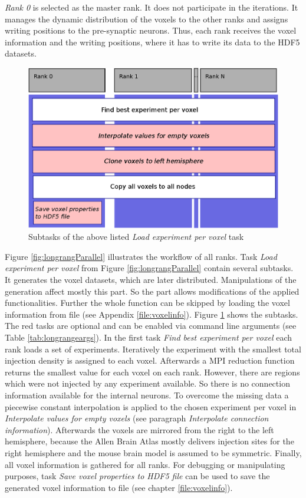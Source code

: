 \emph{Rank 0} is selected as the master rank. It does not participate in the iterations.
It manages the dynamic distribution of the voxels to the other ranks and 
assigns writing positions to the pre-synaptic neurons. Thus, each rank receives the 
voxel information and the writing positions,
where it has to write its data to the HDF5 datasets.
\begin{figure}[ht!]
\centering
\includegraphics[scale=0.5]{pictures/longRange_BestExp_parallelAlg.eps}
\caption{Subtasks of the above listed \emph{Load experiment per voxel} task}
\label{fig:longrangeLEPV}
\end{figure}

Figure \ref{fig:longrangParallel} illustrates the workflow of all ranks.
Task \emph{Load experiment per voxel} from Figure \ref{fig:longrangParallel} contain several subtasks.
It generates the voxel datasets, which are later distributed.
Manipulations of the generation affect mostly this part.
So the part allows modifications of the applied functionalities. 
Further the whole function can be skipped by loading the voxel information from file (see Appendix \ref{file:voxelinfo}).
Figure \ref{fig:longrangeLEPV} shows the subtasks.
The red tasks are optional and can be enabled via command line arguments (see Table \ref{tab:longrangeargs}).
In the first task \emph{Find best experiment per voxel} each rank loads a set of experiments.
Iteratively the experiment with the smallest total injection density is assigned to each voxel.
Afterwards a MPI reduction function returns the smallest value for each voxel on
each rank.
However, there are regions which were not injected by any experiment available.
So there is no connection information available for the internal neurons.
To overcome the missing data a piecewise constant interpolation is applied to the chosen experiment per voxel
in \emph{Interpolate values for empty voxels} (see paragraph \emph{Interpolate connection information}).
Afterwards the voxels are mirrored from the right to the left hemisphere, because the
Allen Brain Atlas mostly delivers injection sites for the right hemisphere and
the mouse brain model is assumed to be symmetric.
Finally, all voxel information is gathered for all ranks.
For debugging or manipulating purposes, task \emph{Save voxel properties to HDF5 file} can be used
to save the generated voxel information to file (see chapter \ref{file:voxelinfo}).

